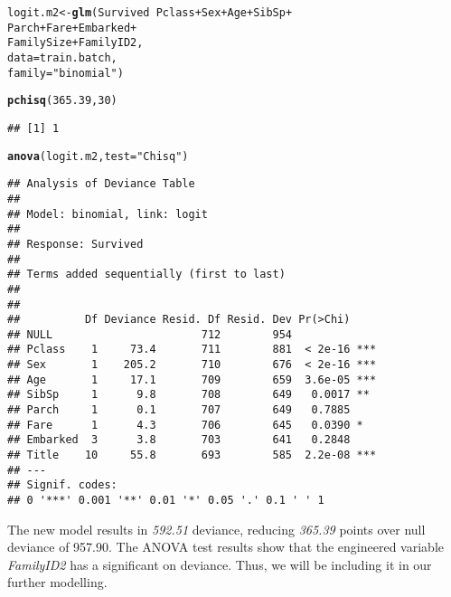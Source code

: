 \documentclass[a4paper,10pt]{report}\usepackage[]{graphicx}\usepackage[]{color}
\makeatletter
\newcommand{\hlnum}[1]{\textcolor[rgb]{0.686,0.059,0.569}{#1}}%
\newcommand{\hlstr}[1]{\textcolor[rgb]{0.192,0.494,0.8}{#1}}%
\newcommand{\hlopt}[1]{\textcolor[rgb]{0,0,0}{#1}}%
\newcommand{\hlstd}[1]{\textcolor[rgb]{0.345,0.345,0.345}{#1}}%
\newcommand{\hlkwb}[1]{\textcolor[rgb]{0.69,0.353,0.396}{#1}}%
\newcommand{\hlkwc}[1]{\textcolor[rgb]{0.333,0.667,0.333}{#1}}%
\newcommand{\hlkwd}[1]{\textcolor[rgb]{0.737,0.353,0.396}{\textbf{#1}}}%
\newenvironment{kframe}{%
 \def\at@end@of@kframe{}%
 \ifinner\ifhmode%
  \def\at@end@of@kframe{\end{minipage}}%
  \begin{minipage}{\columnwidth}%
 \fi\fi%
 \def\FrameCommand##1{\hskip\@totalleftmargin \hskip-\fboxsep
 \colorbox{shadecolor}{##1}\hskip-\fboxsep
     \hskip-\linewidth \hskip-\@totalleftmargin \hskip\columnwidth}%
 \MakeFramed {\advance\hsize-\width
   \@totalleftmargin\z@ \linewidth\hsize
   \@setminipage}}%
 {\par\unskip\endMakeFramed%
 \at@end@of@kframe}
\newenvironment{knitrout}{}{} %
\makeatother
\begin{document}
\begin{knitrout}
\color{fgcolor}\begin{kframe}
\begin{alltt}
\hlstd{logit.m2} \hlkwb{<-} \hlkwd{glm}\hlstd{(Survived} \hlopt{~} \hlstd{Pclass} \hlopt{+} \hlstd{Sex} \hlopt{+} \hlstd{Age} \hlopt{+} \hlstd{SibSp} \hlopt{+}
                  \hlstd{Parch} \hlopt{+} \hlstd{Fare} \hlopt{+} \hlstd{Embarked} \hlopt{+}
                  \hlstd{FamilySize} \hlopt{+} \hlstd{FamilyID2,}
                \hlkwc{data} \hlstd{= train.batch,}
                \hlkwc{family}\hlstd{=}\hlstr{"binomial"}\hlstd{)}
\end{alltt}
\end{kframe}
\end{knitrout}
\begin{knitrout}
\color{fgcolor}\begin{kframe}
\begin{alltt}
\hlkwd{pchisq}\hlstd{(}\hlnum{365.39}\hlstd{,} \hlnum{30}\hlstd{)}
\end{alltt}
\begin{verbatim}
## [1] 1
\end{verbatim}
\begin{alltt}
\hlkwd{anova}\hlstd{(logit.m2,} \hlkwc{test}\hlstd{=}\hlstr{"Chisq"}\hlstd{)}
\end{alltt}
\begin{verbatim}
## Analysis of Deviance Table
## 
## Model: binomial, link: logit
## 
## Response: Survived
## 
## Terms added sequentially (first to last)
## 
## 
##          Df Deviance Resid. Df Resid. Dev Pr(>Chi)    
## NULL                       712        954             
## Pclass    1     73.4       711        881  < 2e-16 ***
## Sex       1    205.2       710        676  < 2e-16 ***
## Age       1     17.1       709        659  3.6e-05 ***
## SibSp     1      9.8       708        649   0.0017 ** 
## Parch     1      0.1       707        649   0.7885    
## Fare      1      4.3       706        645   0.0390 *  
## Embarked  3      3.8       703        641   0.2848    
## Title    10     55.8       693        585  2.2e-08 ***
## ---
## Signif. codes:  
## 0 '***' 0.001 '**' 0.01 '*' 0.05 '.' 0.1 ' ' 1
\end{verbatim}
\end{kframe}
\end{knitrout}

The new model results in \emph{592.51} deviance, reducing \emph{365.39} points over null deviance of 957.90. The ANOVA test results show that the engineered variable \emph{FamilyID2} has a significant on deviance. Thus, we will be including it in our further modelling.
\end{document}
